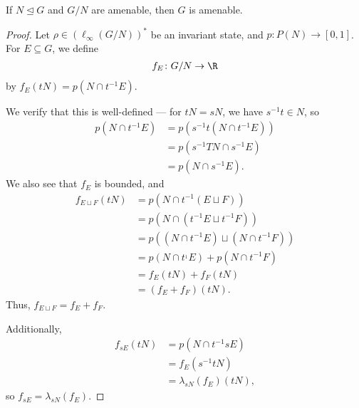 \documentclass[10pt]{mypackage}
\begin{document}
\begin{proposition}
  If $N\trianglelefteq G$ and $G/N$ are amenable, then $G$ is amenable.
\end{proposition}
\begin{proof}
  Let $\rho\in \left(\ell_{\infty}\left(G/N\right)\right)^{\ast}$ be an invariant state, and $p\colon  P(N)\rightarrow [0,1]$. For $E\subseteq G$, we define
  \begin{align*}
    f_E\colon G/N\rightarrow \R
  \end{align*}
  by $f_E\left(tN\right) = p\left(N\cap t^{-1}E\right)$.\newline

  We verify that this is well-defined --- for $tN = sN$, we have $s^{-1}t\in N$, so
  \begin{align*}
    p\left(N\cap t^{-1}E\right) &= p\left(s^{-1}t\left(N\cap t^{-1}E\right)\right)\\
                                &= p\left(s^{-1}TN\cap s^{-1}E\right)\\
                                &= p\left(N\cap s^{-1}E\right).
  \end{align*}
  We also see that $f_E$ is bounded, and
  \begin{align*}
    f_{E\sqcup F} \left(tN\right) &= p\left(N\cap t^{-1}\left(E\sqcup F\right)\right)\\
                                  &= p\left(N\cap \left(t^{-1}E\sqcup t^{-1}F\right)\right)\\
                                  &= p\left(\left(N\cap t^{-1}E\right)\sqcup \left(N\cap t^{-1}F\right)\right)\\
                                  &= p\left(N\cap t^{_1}E\right) + p\left(N\cap t^{-1}F\right)\\
                                  &= f_E\left(tN\right) + f_{F}\left(tN\right)\\
                                  &= \left(f_E + f_F\right)\left(tN\right).
  \end{align*}
  Thus, $f_{E\sqcup F} = f_E + f_F$.\newline

  Additionally,
  \begin{align*}
    f_{sE}\left(tN\right) &= p\left(N\cap t^{-1}sE\right)\\
                          &= f_E\left(s^{-1}t N\right)\\
                          &= \lambda_{sN}\left(f_E\right)\left(tN\right),
  \end{align*}
  so $f_{sE} = \lambda_{sN}\left(f_{E}\right)$.\newline


\end{proof}
\end{document}
